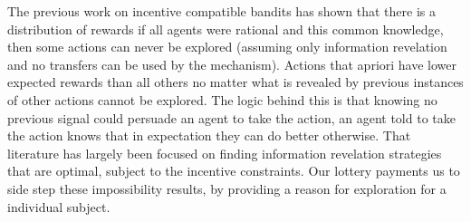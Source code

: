 The previous work on incentive compatible bandits \cite{kremer2014implementing,mansour2015bayesian} has shown that there is a distribution of rewards if all agents were rational and this common knowledge, then some actions can never be explored (assuming only information revelation and no transfers can be used by the mechanism). 
Actions that apriori have lower expected rewards than all others no matter what is revealed by previous instances of other actions cannot be explored.
The logic behind this is that knowing no previous signal could persuade an agent to take the action, an agent told to take the action knows that in expectation they can do better otherwise.
That literature has largely been focused on finding information revelation strategies that are optimal, subject to the incentive constraints. 
Our lottery payments us to side step these impossibility results, by providing a reason for exploration for a individual subject. 





